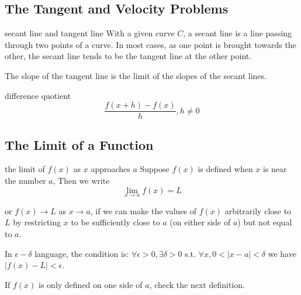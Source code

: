 \documentclass[Calculus 1 Recitation.tex]{subfiles}
\begin{document}
\subsection{The Tangent and Velocity Problems}

\begin{myleftlinebox}
	secant line and tangent line
	\tcblower
	With a given curve $C$, a secant line is a line passing through two points of a curve. In most cases, as one point is brought towards the other, the secant line tends to be the tangent line at the other point.

	The slope of the tangent line is the limit of the slopes of the secant
	lines.
\end{myleftlinebox}

\begin{myleftlinebox}
	difference quotient
	\tcblower
	\[\frac{f(x+h)-f(x)}{h}, h\neq0\]
\end{myleftlinebox}


\subsection{The Limit of a Function}\label{sec:funcLimit}

\begin{myleftlinebox}
	the limit of $f(x)$ as $x$ approaches $a$
	\tcblower
	Suppose $f(x)$ is defined when $x$ is near the number $a$, Then we write
	\[\lim_{x\to a}f(x)=L\]

	or \(f(x)\to L\) as $x\to a$, if we can make the values of $f(x)$ arbitrarily close to $L$ 	by restricting $x$ to be sufficiently close to $a$ (on either side of $a$) but not equal to $a$. 

	In $\epsilon-\delta$ language, the condition is: $\forall \epsilon > 0, \exists \delta > 0$ s.t. $\forall x, 0 < |x - a| < \delta$ we have $|f(x) - L| < \epsilon$.

	If $f(x)$ is only defined on one side of $a$, check the next definition.
\end{myleftlinebox}
\end{document}
